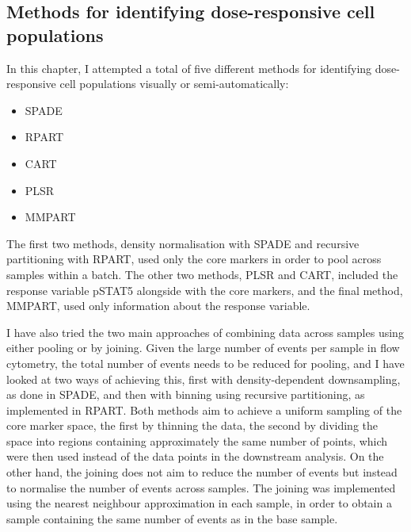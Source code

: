 \subsection{ Methods for identifying dose-responsive cell populations }

In this chapter, I attempted a total of five different methods for identifying dose-responsive cell populations visually or semi-automatically:
\begin{itemize}[noitemsep,topsep=0pt,parsep=0pt,partopsep=0pt]
    \item SPADE
    \item RPART
    \item CART
    \item PLSR
    \item MMPART
\end{itemize}
The first two methods, density normalisation with SPADE and recursive partitioning with RPART, used only the core markers in order to pool across samples within a batch.
The other two methods, PLSR and CART, included the response variable pSTAT5 alongside with the core markers, and the final method, MMPART, used only information about the response variable.

I have also tried the two main approaches of combining data across samples using either pooling or by joining.
Given the large number of events per sample in flow cytometry, the total number of events needs to be reduced for pooling,
and I have looked at two ways of achieving this, first with density-dependent downsampling, as done in SPADE, and then with binning
using recursive partitioning, as implemented in RPART.
Both methods aim to achieve a uniform sampling of the core marker space, the first by thinning the data, the second by dividing the space into regions containing approximately the same number of points, which were then used instead of the data points in the downstream analysis.
On the other hand, the joining does not aim to reduce the number of events but instead to normalise the number of events
across samples.
The joining was implemented using the nearest neighbour approximation in each sample, in order to obtain a sample
containing the same number of events as in the base sample.

